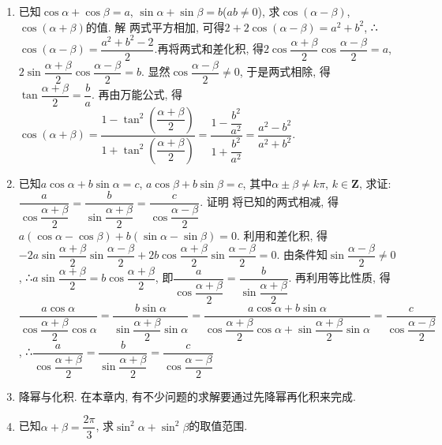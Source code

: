 \documentclass[10pt,a4paper]{article}
\begin{document}
\begin{enumerate}[1.]
\item 已知$\cos \alpha +\cos \beta =a$, $\sin \alpha +\sin \beta =b$($ab\ne 0$), 求$\cos (\alpha -\beta)$, $\cos (\alpha +\beta)$的值.
解  两式平方相加, 可得$2+2\cos (\alpha -\beta)=a^2+b^2$, ∴$\cos (\alpha -\beta)=\dfrac{a^2+b^2-2}2$.再将两式和差化积, 得$2\cos \dfrac{\alpha +\beta }2\cos \dfrac{\alpha -\beta }2=a$, $2\sin \dfrac{\alpha +\beta }2\cos \dfrac{\alpha -\beta }2=b$.
显然$\cos \dfrac{\alpha -\beta }2\ne 0$, 于是两式相除, 得$\tan \dfrac{\alpha +\beta }2=\dfrac ba$.
再由万能公式, 得$\cos (\alpha +\beta)=\dfrac{1-\tan ^2(\dfrac{\alpha +\beta} 2)}{1+\tan ^2(\dfrac{\alpha +\beta }2)}=\dfrac{1-\dfrac{b^2}{a^2}}{1+\dfrac{b^2}{a^2}}=\dfrac{a^2-b^2}{a^2+b^2}$.
\item 已知$a\cos \alpha +b\sin \alpha =c$, $a\cos \beta +b\sin \beta =c$, 其中$\alpha \pm \beta \ne k\pi$, $k\in \mathbf{Z}$, 求证: $\dfrac a{\cos \dfrac{\alpha +\beta }2}=\dfrac b{\sin \dfrac{\alpha +\beta }2}=\dfrac c{\cos \dfrac{\alpha -\beta }2}$.
证明  将已知的两式相减, 得$a(\cos \alpha -\cos \beta)+b(\sin \alpha -\sin \beta)=0$.
利用和差化积, 得$-2a\sin \dfrac{\alpha +\beta }2\sin \dfrac{\alpha -\beta }2+2b\cos \dfrac{\alpha +\beta }2\sin \dfrac{\alpha -\beta }2=0$.
由条件知$\sin \dfrac{\alpha -\beta }2\ne 0$, ∴$a\sin \dfrac{\alpha +\beta }2=b\cos \dfrac{\alpha +\beta }2$, 即$\dfrac a{\cos \dfrac{\alpha +\beta }2}=\dfrac b{\sin \dfrac{\alpha +\beta }2}$.
再利用等比性质, 得$\dfrac{a\cos \alpha }{\cos \dfrac{\alpha +\beta }2\cos \alpha }=\dfrac{b\sin \alpha }{\sin \dfrac{\alpha +\beta }2\sin \alpha }=\dfrac{a\cos \alpha +b\sin \alpha }{\cos \dfrac{\alpha +\beta }2\cos \alpha +\sin \dfrac{\alpha +\beta }2\sin \alpha }=\dfrac c{\cos \dfrac{\alpha -\beta }2}$,
∴$\dfrac a{\cos \dfrac{\alpha +\beta }2}=\dfrac b{\sin \dfrac{\alpha +\beta }2}=\dfrac c{\cos \dfrac{\alpha -\beta }2}$
\item 降幂与化积.
在本章内, 有不少问题的求解要通过先降幂再化积来完成.
\item 已知$\alpha +\beta =\dfrac{2\pi }3$, 求$\sin ^2\alpha +\sin ^2\beta$的取值范围.


\end{enumerate}
\end{document}
